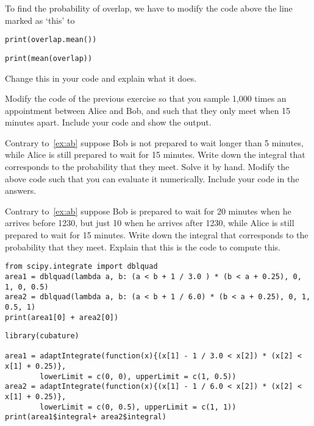 \begin{exercise}
To find the probability of overlap, we have to modify the code above the line marked as `this' to
\begin{verbatim}
print(overlap.mean())
\end{verbatim}

\begin{verbatim}
print(mean(overlap))
\end{verbatim}

Change this in your code and explain what it does.
\end{exercise}


\begin{exercise}
Modify the  code of the previous exercise so that you sample 1,000 times an appointment between Alice and Bob, and such that they only meet when 15 minutes apart. Include your code and show the output.
\end{exercise}


\begin{exercise}
Contrary to~\cref{ex:ab} suppose Bob is not prepared to wait longer than 5 minutes, while Alice is still prepared to wait for 15 minutes. Write down the integral that corresponds to the probability that they meet.  Solve it by hand. Modify the above code such that you can evaluate it numerically. Include your code in the answers.
\end{exercise}

\begin{exercise}
Contrary to~\cref{ex:ab} suppose Bob is prepared to wait for 20 minutes when he arrives before 1230, but just 10 when he arrives after 1230, while Alice is still prepared to wait for 15 minutes. Write down the integral that corresponds to the probability that they meet. Explain that this is the code to compute this.

\begin{verbatim}
from scipy.integrate import dblquad
area1 = dblquad(lambda a, b: (a < b + 1 / 3.0 ) * (b < a + 0.25), 0, 1, 0, 0.5)
area2 = dblquad(lambda a, b: (a < b + 1 / 6.0) * (b < a + 0.25), 0, 1, 0.5, 1)
print(area1[0] + area2[0])
\end{verbatim}

\begin{verbatim}
library(cubature)

area1 = adaptIntegrate(function(x){(x[1] - 1 / 3.0 < x[2]) * (x[2] < x[1] + 0.25)},
        lowerLimit = c(0, 0), upperLimit = c(1, 0.5))
area2 = adaptIntegrate(function(x){(x[1] - 1 / 6.0 < x[2]) * (x[2] < x[1] + 0.25)},
        lowerLimit = c(0, 0.5), upperLimit = c(1, 1))
print(area1$integral+ area2$integral)
\end{verbatim}

\end{exercise}

